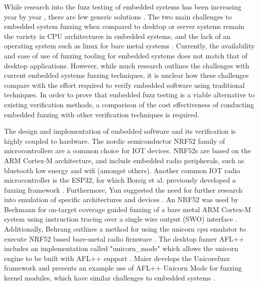 \documentclass[11pt]{article}
\begin{document}
While research into the fuzz testing of embedded systems has been increasing
year by year \citep{Yun_2022}, there are few generic solutions
\citep{Eisele_et_al_2022}. The two main challenges to embedded system fuzzing
when compared to desktop or server systems remain the variety in CPU
architectures in embedded systems, and the lack of an operating system such as
linux for bare metal systems \citep{Eisele_et_al_2022}. Currently, the
availability and ease of use of fuzzing tooling for embedded systems does not
match that of desktop applications. However, while much research outlines the
challenges with current embedded systems fuzzing techniques, it is unclear how
these challenges compare with the effort required to verify embedded software
using traditional techniques. In order to prove that embedded fuzz testing is a
viable alternative to existing verification methods, a comparison of the cost
effectiveness of conducting embedded fuzzing with other verification techniques
is required.

The design and implementation of embedded software and its verification is
highly coupled to hardware. The nordic semiconductor NRF52 family of
microcontrollers are a common choice for IOT devices. NRF52s are based on the
ARM Cortex-M architecture, and include embedded radio peripherals, such as
bluetooth low energy and wifi (amongst others). Another common IOT radio
microcontroller is the ESP32, for which Borsig et al. previously developed a
fuzzing framework \citep{Borsig_2020}. Furthermore, Yun suggested the need for
further research into emulation of specific architectures and devices
\citep{Yun_2022}. An NRF52 was used by Beckmann for on-target coverage guided
fuzzing of a bare metal ARM Cortex-M system using instruction tracing over a
single wire output (SWO) interface \citep{Beckmann_2023}. Additionally, Behrang
outlines a method for using the unicorn cpu emulator to execute NRF52 based
bare-metal radio firmware \citep{Behrang_2023}. The desktop fuzzer AFL++
includes an implementation called "unicorn\_mode" which allows the unicorn
engine to be built with AFL++ support \citep{UnicornMode}. Maier develops the
Unicorefuzz framework and presents an example use of AFL++ Unicorn Mode for
fuzzing kernel modules, which have similar challenges to embedded systems
\citep{Maier_2019}.



\end{document}
